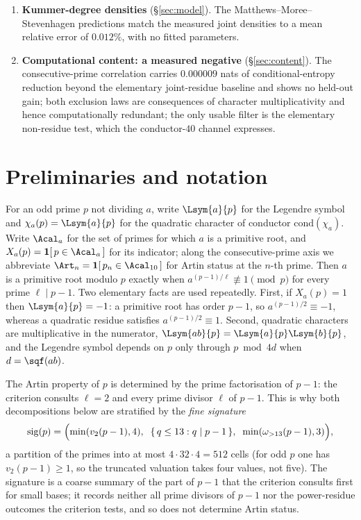 \begin{enumerate}
	channel.
	\item \textbf{Kummer-degree densities} (\S\ref{sec:model}). The
	Matthews--Moree--Stevenhagen predictions match the measured joint densities to a mean
	relative error of $0.012\%$, with no fitted parameters.
	\item \textbf{Computational content: a measured negative} (\S\ref{sec:content}). The
	consecutive-prime correlation carries $0.000009$ nats of conditional-entropy reduction
	beyond the elementary joint-residue baseline and shows no held-out gain; both exclusion
	laws are consequences of character multiplicativity and hence computationally redundant;
	the only usable filter is the elementary non-residue test, which the conductor-$40$
	channel expresses.
\end{enumerate}

\section{Preliminaries and notation}
\label{sec:prelim}

For an odd prime $p$ not dividing $a$, write $\Lsym{a}{p}$ for the Legendre symbol and
$\chi_a(p)=\Lsym{a}{p}$ for the quadratic character of conductor $\mathrm{cond}(\chi_a)$.
Write $\Acal_a$ for the set of primes for which $a$ is a primitive root, and
$X_a(p)=\mathbf{1}[\,p\in\Acal_a\,]$ for its indicator; along the consecutive-prime axis we
abbreviate $\Art_n = \mathbf{1}[\,p_n\in\Acal_{10}\,]$ for Artin status at the $n$-th prime.
Then $a$ is a primitive root modulo $p$ exactly when $a^{(p-1)/\ell}\not\equiv 1 \pmod p$ for every prime
$\ell \mid p-1$. Two elementary facts are used repeatedly. First, if $X_a(p)=1$ then
$\Lsym{a}{p}=-1$: a primitive root has order $p-1$, so $a^{(p-1)/2}\equiv -1$, whereas a
quadratic residue satisfies $a^{(p-1)/2}\equiv 1$. Second, quadratic characters are
multiplicative in the numerator, $\Lsym{ab}{p}=\Lsym{a}{p}\Lsym{b}{p}$, and the Legendre
symbol depends on $p$ only through $p \bmod 4d$ when $d=\sqf(ab)$.

The Artin property of $p$ is determined by the prime factorisation of $p-1$: the criterion
consults $\ell=2$ and every prime divisor $\ell$ of $p-1$. This is why both decompositions
below are stratified by the \emph{fine signature}
\[
	\mathrm{sig}(p) = \Bigl(\min(v_2(p-1),4),\;\; \{\,q\le 13 : q\mid p-1\,\},\;\;
	\min(\omega_{>13}(p-1),3)\Bigr),
\]
a partition of the primes into at most $4\cdot 32\cdot 4 = 512$ cells (for odd $p$ one has
$v_2(p-1)\ge 1$, so the truncated valuation takes four values, not five). The signature
is a coarse summary of the part of $p-1$ that the criterion consults first for small bases;
it records neither all prime divisors of $p-1$ nor the power-residue outcomes the criterion
tests, and so does not determine Artin status.
